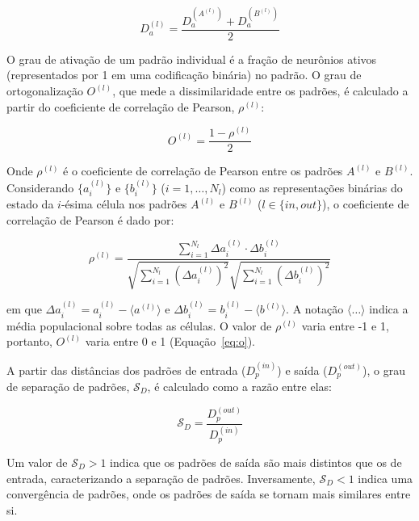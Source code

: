 \begin{equation}
    \label{eq:da}
    D_a^{(l)} = \frac{D_a^{(A^{(l)})} + D_a^{(B^{(l)})}}{2}
\end{equation}

O grau de ativação de um padrão individual é a fração de neurônios ativos (representados por 1 em uma codificação binária) no padrão.
O grau de ortogonalização $O^{(l)}$, que mede a dissimilaridade entre os padrões, é calculado a partir do coeficiente de correlação de Pearson, $\rho^{(l)}$:

\begin{equation}
    \label{eq:o}
    O^{(l)} = \frac{1 - \rho^{(l)}}{2}
\end{equation}

Onde $\rho^{(l)}$ é o coeficiente de correlação de Pearson entre os padrões $A^{(l)}$ e $B^{(l)}$.
Considerando $\{a_i^{(l)}\}$ e $\{b_i^{(l)}\}$ ($i=1, \dots, N_l$) como as representações binárias do estado da $i$-ésima célula nos padrões $A^{(l)}$ e $B^{(l)}$ ($l \in \{in, out\}$), o coeficiente de correlação de Pearson é dado por:

\begin{equation}
    \label{eq:pearson}
    \rho^{(l)} = \frac{\sum_{i=1}^{N_l} \Delta a_i^{(l)} \cdot \Delta b_i^{(l)}}{\sqrt{\sum_{i=1}^{N_l} (\Delta a_i^{(l)})^2} \sqrt{\sum_{i=1}^{N_l} (\Delta b_i^{(l)})^2}}
\end{equation}

em que $\Delta a_i^{(l)} = a_i^{(l)} - \langle a^{(l)} \rangle$ e $\Delta b_i^{(l)} = b_i^{(l)} - \langle b^{(l)} \rangle$. A
notação $\langle \dots \rangle$ indica a média populacional sobre todas as células. O valor de $\rho^{(l)}$ varia entre -1 e 1,
portanto, $O^{(l)}$ varia entre 0 e 1 (Equação~\ref{eq:o}).

A partir das distâncias dos padrões de entrada ($D_p^{(in)}$) e saída ($D_p^{(out)}$), o grau de separação de padrões, $\mathcal{S}_D$, é calculado como a razão entre elas:

\begin{equation}
    \label{eq:sd}
    \mathcal{S}_D = \frac{D_p^{(out)}}{D_p^{(in)}}
\end{equation}

Um valor de $\mathcal{S}_D > 1$ indica que os padrões de saída são mais distintos que os de entrada, caracterizando a separação de padrões. Inversamente, $\mathcal{S}_D < 1$ indica uma convergência de padrões, onde os padrões de saída se tornam mais similares entre si.


